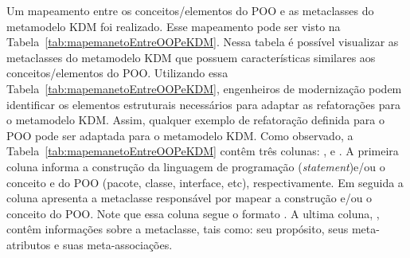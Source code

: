 Um mapeamento entre os conceitos/elementos do POO e as metaclasses do metamodelo KDM foi realizado. Esse mapeamento pode ser visto na Tabela~\ref{tab:mapemanetoEntreOOPeKDM}. Nessa tabela é possível visualizar as metaclasses do metamodelo KDM que possuem características similares aos conceitos/elementos do POO. Utilizando essa Tabela~\ref{tab:mapemanetoEntreOOPeKDM}, engenheiros de modernização podem identificar os elementos estruturais necessários para adaptar as refatorações para o metamodelo KDM. Assim, qualquer exemplo de refatoração definida para o POO pode ser adaptada para o metamodelo KDM. Como observado, a Tabela~\ref{tab:mapemanetoEntreOOPeKDM} contêm três colunas: ,  e . A primeira coluna informa a construção da linguagem de programação (\textit{statement})e/ou o conceito e do POO (pacote, classe, interface, etc), respectivamente. Em seguida a coluna  apresenta a metaclasse responsável por mapear a construção e/ou o conceito do POO. Note que essa coluna segue o formato . A ultima coluna, , contêm informações sobre a metaclasse, tais como: seu propósito, seus meta-atributos e suas meta-associações.

